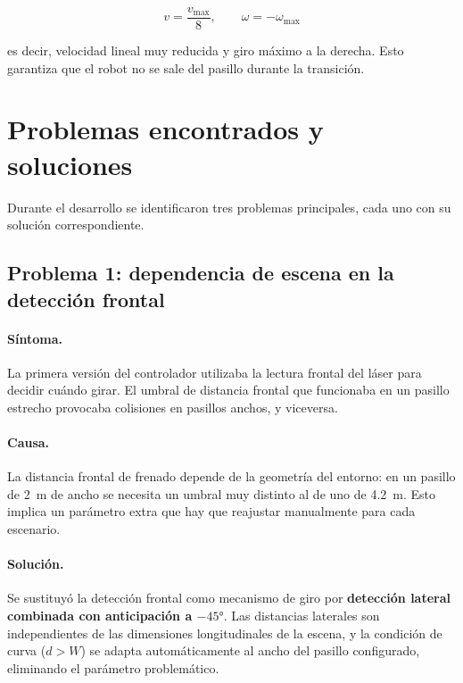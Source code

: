\documentclass[12pt]{article}
\begin{document}
\[
  v = \frac{v_\text{max}}{8}, \qquad \omega = -\omega_\text{max}
\]

es decir, velocidad lineal muy reducida y giro máximo a la derecha. Esto garantiza que el robot no se sale del pasillo durante la transición.


\section{Problemas encontrados y soluciones}

Durante el desarrollo se identificaron tres problemas principales, cada uno con su solución correspondiente.

\subsection{Problema 1: dependencia de escena en la detección frontal}

\paragraph{Síntoma.}
La primera versión del controlador utilizaba la lectura frontal del láser para decidir cuándo girar. El umbral de distancia frontal que funcionaba en un pasillo estrecho provocaba colisiones en pasillos anchos, y viceversa.

\paragraph{Causa.}
La distancia frontal de frenado depende de la geometría del entorno: en un pasillo de \SI{2}{\meter} de ancho se necesita un umbral muy distinto al de uno de \SI{4.2}{\meter}. Esto implica un parámetro extra que hay que reajustar manualmente para cada escenario.

\paragraph{Solución.}
Se sustituyó la detección frontal como mecanismo de giro por \textbf{detección lateral combinada con anticipación a $-45°$}. Las distancias laterales son independientes de las dimensiones longitudinales de la escena, y la condición de curva ($d > W$) se adapta automáticamente al ancho del pasillo configurado, eliminando el parámetro problemático.
\end{document}
